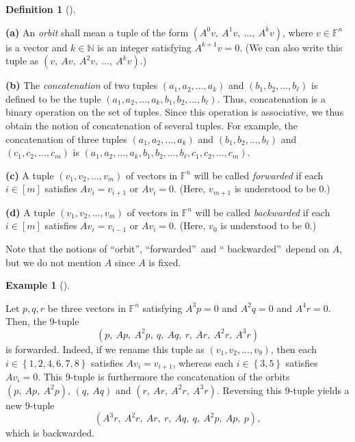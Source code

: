 \documentclass[numbers=enddot,12pt,final,onecolumn,notitlepage]{scrartcl}%
\numberwithin{exer}{subsection}
\theoremstyle{definition}
\newtheorem{defi}[theo]{Definition}
\newenvironment{definition}[1][]
{\begin{defi}[#1]\begin{leftbar}}
{\end{leftbar}\end{defi}}
\newtheorem{exam}[theo]{Example}
\newenvironment{example}[1][]
{\begin{exam}[#1]\begin{leftbar}}
{\end{leftbar}\end{exam}}
\begin{document}
\begin{definition}
\label{def.jnf.exist.step3.orbits-etc}\textbf{(a)} An \emph{orbit} shall mean
a tuple of the form $\left(  A^{0}v,\ A^{1}v,\ \ldots,\ A^{k}v\right)  $,
where $v\in\mathbb{F}^{n}$ is a vector and $k\in\mathbb{N}$ is an integer
satisfying $A^{k+1}v=0$. (We can also write this tuple as $\left(
v,\ Av,\ A^{2}v,\ \ldots,\ A^{k}v\right)  $.) \medskip

\textbf{(b)} The \emph{concatenation} of two tuples $\left(  a_{1}%
,a_{2},\ldots,a_{k}\right)  $ and $\left(  b_{1},b_{2},\ldots,b_{\ell}\right)
$ is defined to be the tuple $\left(  a_{1},a_{2},\ldots,a_{k},b_{1}%
,b_{2},\ldots,b_{\ell}\right)  $. Thus, concatenation is a binary operation on
the set of tuples. Since this operation is associative, we thus obtain the
notion of concatenation of several tuples. For example, the concatenation of
three tuples $\left(  a_{1},a_{2},\ldots,a_{k}\right)  $ and $\left(
b_{1},b_{2},\ldots,b_{\ell}\right)  $ and $\left(  c_{1},c_{2},\ldots
,c_{m}\right)  $ is $\left(  a_{1},a_{2},\ldots,a_{k},b_{1},b_{2}%
,\ldots,b_{\ell},c_{1},c_{2},\ldots,c_{m}\right)  $. \medskip

\textbf{(c)} A tuple $\left(  v_{1},v_{2},\ldots,v_{m}\right)  $ of vectors in
$\mathbb{F}^{n}$ will be called \emph{forwarded} if each $i\in\left[
m\right]  $ satisfies $Av_{i}=v_{i+1}$ or $Av_{i}=0$. (Here, $v_{m+1}$ is
understood to be $0$.) \medskip

\textbf{(d)} A tuple $\left(  v_{1},v_{2},\ldots,v_{m}\right)  $ of vectors in
$\mathbb{F}^{n}$ will be called \emph{backwarded} if each $i\in\left[
m\right]  $ satisfies $Av_{i}=v_{i-1}$ or $Av_{i}=0$. (Here, $v_{0}$ is
understood to be $0$.) \medskip

Note that the notions of \textquotedblleft orbit\textquotedblright,
\textquotedblleft forwarded\textquotedblright\ and \textquotedblleft
backwarded\textquotedblright\ depend on $A$, but we do not mention $A$ since
$A$ is fixed.
\end{definition}

\begin{example}
Let $p,q,r$ be three vectors in $\mathbb{F}^{n}$ satisfying $A^{3}p=0$ and
$A^{2}q=0$ and $A^{4}r=0$. Then, the $9$-tuple
\[
\left(  p,\ Ap,\ A^{2}p,\ q,\ Aq,\ r,\ Ar,\ A^{2}r,\ A^{3}r\right)
\]
is forwarded. Indeed, if we rename this tuple as $\left(  v_{1},v_{2}%
,\ldots,v_{9}\right)  $, then each $i\in\left\{  1,2,4,6,7,8\right\}  $
satisfies $Av_{i}=v_{i+1}$, whereas each $i\in\left\{  3,5\right\}  $
satisfies $Av_{i}=0$. This $9$-tuple is furthermore the concatenation of the
orbits $\left(  p,\ Ap,\ A^{2}p\right)  $, $\left(  q,\ Aq\right)  $ and
$\left(  r,\ Ar,\ A^{2}r,\ A^{3}r\right)  $. Reversing this $9$-tuple yields a
new $9$-tuple%
\[
\left(  A^{3}r,\ A^{2}r,\ Ar,\ r,\ Aq,\ q,\ A^{2}p,\ Ap,\ p\right)  ,
\]
which is backwarded.
\end{example}
\end{document}
